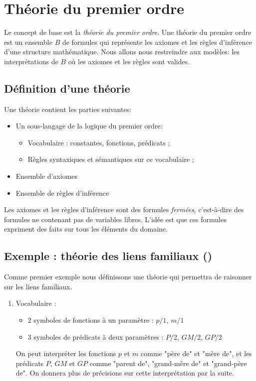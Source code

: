 {\section{Théorie du premier ordre}

Le concept de base est la {\em théorie du premier ordre}.
Une théorie du premier ordre est un ensemble $B$ de formules
qui représente les axiomes et les règles d'inférence d'une structure mathématique.
Nous allons nous restreindre aux modèles: les interprétations de $B$
où les axiomes et les règles sont valides.

\subsection{Définition d'une théorie}

Une théorie contient les parties suivantes:
\begin{itemize}
\item Un sous-langage de la logique du premier ordre:
\begin{itemize}
\item Vocabulaire : constantes, fonctions, prédicats ;
\item Règles syntaxiques et sémantiques sur ce vocabulaire ;
\end{itemize}
\item Ensemble d'axiomes
\item Ensemble de règles d'inférence
\end{itemize}
Les axiomes et les règles d'inférence sont des
formules {\em fermées}, c'est-à-dire des formules ne contenant pas de variables libres.
L'idée est que ces formules expriment des faits sur tous les éléments du domaine.

\subsection{Exemple : théorie des liens familiaux ()}

Comme premier exemple
nous définissons une théorie qui permettra de raisonner sur les liens familiaux.

\begin{enumerate}
\item Vocabulaire : 
\begin{itemize}
\item 2 symboles de fonctions à un paramètre : $p/1$, $m/1$
\item 3 symboles de prédicats à deux paramètres : $P/2$, $GM/2$, $GP/2$\\
\end{itemize}
On peut interpréter les fonctions $p$ et $m$ comme "père de" et "mère de", et les prédicats $P$, $GM$ et $GP$ comme "parent de", "grand-mère de" et "grand-père de". On donnera plus de précisions sur cette interprétation par la suite.\\


\end{enumerate}}
